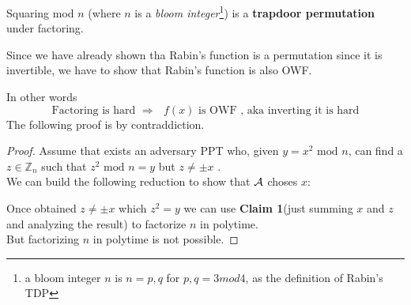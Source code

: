 \begin{theorem}
    Squaring mod $n$ (where $n$ is a \textit{bloom integer}\footnote{ a bloom
    integer $n$ is $n=p,q$ for $p,q=3 mod 4$, as the definition of Rabin's TDP})
    is a \textbf{trapdoor permutation} under factoring.
\end{theorem}
Since we have already shown tha Rabin's function is a permutation since it is
invertible, we have to show that Rabin's function is also OWF.

In other words
\[
    \text{Factoring is hard } \Rightarrow \text{ $f(x)$ is OWF , aka inverting
    it is hard}
\]
The following proof is by contraddiction.
\begin{proof}
    Assume that exists an adversary PPT who, given $y=x^{2} \text{ mod }
    n$, can find a $z \in \mathbb{Z}_{n} $ such that $z^{2} \text{ mod } n=y$
    but $z\neq \pm x$ .\\

    We can build the following reduction to show that $\mathcal{A}$ choses $x$:

\begin{figure}[h!]
   \centering
   \sdinit{}
\end{figure}

Once obtained $z\neq \pm x$ which $z^{2}=y$ we can use \textbf{Claim 1}(just
summing $x$ and $z$ and analyzing the result) to factorize $n$ in
polytime.\\

But factorizing $n$ in polytime is not possible.
\end{proof}


